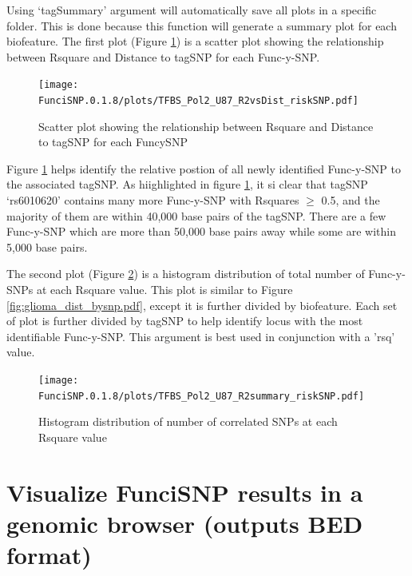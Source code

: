 \documentclass[12pt,fullpage]{article}
\begin{document}
Using `tagSummary' argument will automatically save all plots in a specific
folder. This is done because this function will generate a summary plot for each
biofeature. The first plot (Figure \ref{fig:TFBS_Pol2_U87_R2vsDist_riskSNP.pdf})
is a scatter plot showing the relationship between Rsquare and Distance to
tagSNP for each Func-y-SNP. 

\begin{figure}[ht!]
\begin{center}
\texttt{[image: FunciSNP.0.1.8/plots/TFBS\_Pol2\_U87\_R2vsDist\_riskSNP.pdf]}
\caption{\label{fig:TFBS_Pol2_U87_R2vsDist_riskSNP.pdf} Scatter plot 
showing the relationship between Rsquare and Distance to tagSNP for each 
FuncySNP}
{\footnotesize{}}
\end{center}
\end{figure}

Figure \ref{fig:TFBS_Pol2_U87_R2vsDist_riskSNP.pdf} helps identify the relative
postion of all newly identified Func-y-SNP to the associated tagSNP. As
hiighlighted in figure \ref{fig:TFBS_Pol2_U87_R2vsDist_riskSNP.pdf}, it si clear
that tagSNP `rs6010620' contains many more Func-y-SNP with Rsquares $\ge$ 0.5,
and the majority of them are within 40,000 base pairs of the tagSNP. There are a
few Func-y-SNP which are more than 50,000 base pairs away while some are within
5,000 base pairs.

The second plot (Figure \ref{fig:TFBS_Pol2_U87_R2summary_riskSNP.pdf}) is a
histogram distribution of total number of Func-y-SNPs at each Rsquare value.
This plot is similar to Figure \ref{fig:glioma_dist_bysnp.pdf}, except it is
further divided by biofeature. Each set of plot is further divided by tagSNP to help identify locus with the most identifiable Func-y-SNP. This argument is best used in conjunction with a 'rsq' value.

\begin{figure}[ht!]
\begin{center}
\texttt{[image: FunciSNP.0.1.8/plots/TFBS\_Pol2\_U87\_R2summary\_riskSNP.pdf]}
\caption{\label{fig:TFBS_Pol2_U87_R2summary_riskSNP.pdf} Histogram 
distribution of number of correlated SNPs at each Rsquare value}
{\footnotesize{}}
\end{center}
\end{figure}

\newpage


\section{Visualize FunciSNP results in a genomic browser (outputs BED format)}
\end{document}
